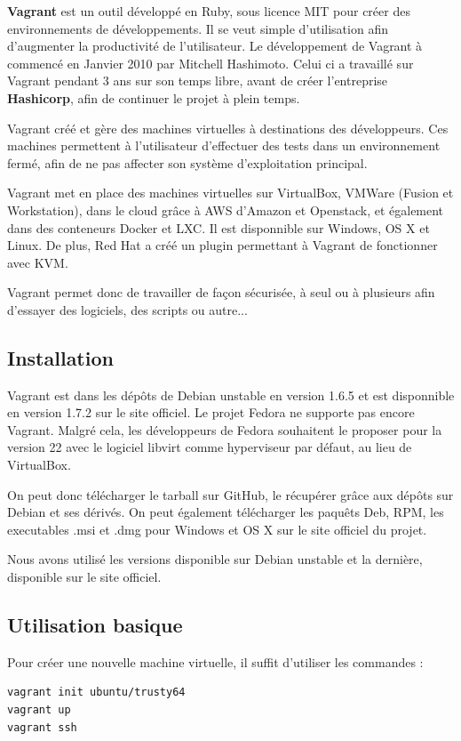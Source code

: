\documentclass[12pt,a4paper]{article}
\begin{document}
\textbf{Vagrant} est un outil développé en Ruby, sous licence MIT pour créer des environnements de développements. Il se veut simple d'utilisation afin d'augmenter la productivité de l'utilisateur. Le développement de Vagrant à commencé en Janvier 2010 par Mitchell Hashimoto. Celui ci a travaillé sur Vagrant pendant 3 ans sur son temps libre, avant de créer l'entreprise \textbf{Hashicorp}, afin de continuer le projet à plein temps.

Vagrant créé et gère des machines virtuelles à destinations des développeurs. Ces machines permettent à l'utilisateur d'effectuer des tests dans un environnement fermé, afin de ne pas affecter son système d'exploitation principal. 

Vagrant met en place des machines virtuelles sur VirtualBox, VMWare (Fusion et Workstation), dans le cloud grâce à AWS d'Amazon et Openstack, et également dans des conteneurs Docker et LXC. Il est disponnible sur Windows, OS X et Linux. De plus, Red Hat a créé un plugin permettant à Vagrant de fonctionner avec KVM.

Vagrant permet donc de travailler de façon sécurisée, à seul ou à plusieurs afin d'essayer des logiciels, des scripts ou autre...

\subsection{Installation}
Vagrant est dans les dépôts de Debian unstable en version 1.6.5 et est disponnible en version 1.7.2 sur le site officiel. Le projet Fedora ne supporte pas encore Vagrant. Malgré cela, les développeurs de Fedora souhaitent le proposer pour la version 22 avec le logiciel libvirt comme hyperviseur par défaut, au lieu de VirtualBox.

On peut donc télécharger le tarball sur GitHub, le récupérer grâce aux dépôts sur Debian et ses dérivés. On peut également télécharger les paquêts Deb, RPM, les executables .msi et .dmg pour Windows et OS X sur le site officiel du projet.

Nous avons utilisé les versions disponible sur Debian unstable et la dernière, disponible sur le site officiel.

\subsection{Utilisation basique}

Pour créer une nouvelle machine virtuelle, il suffit d'utiliser les commandes :
\begin{lstlisting}
vagrant init ubuntu/trusty64
vagrant up
vagrant ssh
\end{lstlisting}
\end{document}
